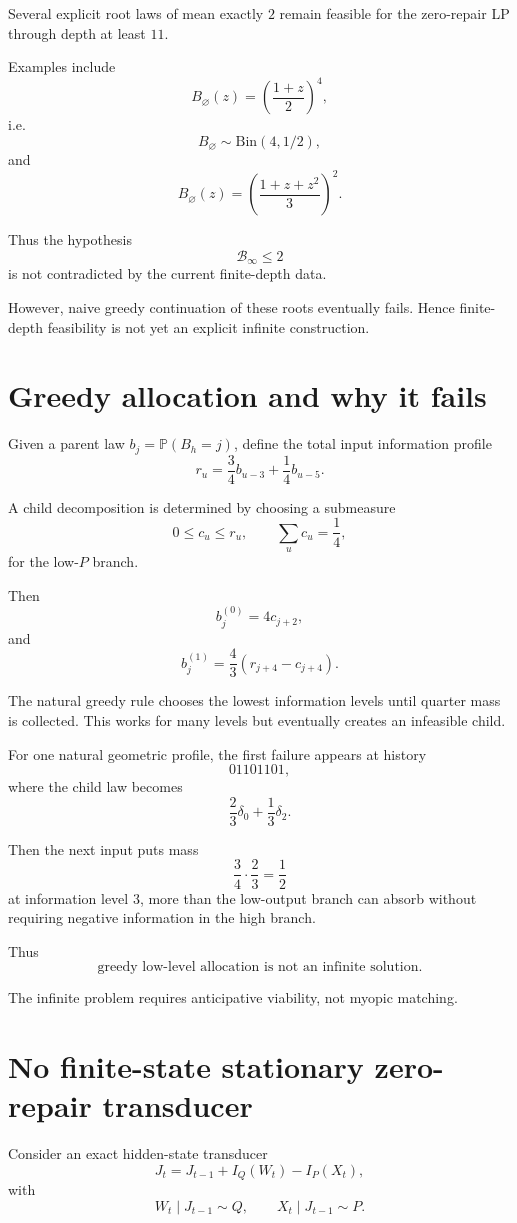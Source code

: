 \documentclass[11pt,a4paper]{article}
\newcommand{\PP}{\mathbb P}
\newcommand{\cB}{\mathcal B}
\begin{document}
Several explicit root laws of mean exactly \(2\) remain feasible for the
zero-repair LP through depth at least \(11\).

Examples include
\[
B_\varnothing(z)
=
\left(\frac{1+z}{2}\right)^4,
\]
i.e.
\[
B_\varnothing\sim \mathrm{Bin}(4,1/2),
\]
and
\[
B_\varnothing(z)
=
\left(\frac{1+z+z^2}{3}\right)^2.
\]

Thus the hypothesis
\[
\cB_\infty\le2
\]
is not contradicted by the current finite-depth data.

However, naive greedy continuation of these roots eventually fails.
Hence finite-depth feasibility is not yet an explicit infinite construction.

\section{Greedy allocation and why it fails}

Given a parent law \(b_j=\PP(B_h=j)\), define the total input information
profile
\[
r_u
=
\frac34 b_{u-3}
+
\frac14 b_{u-5}.
\]

A child decomposition is determined by choosing a submeasure
\[
0\le c_u\le r_u,
\qquad
\sum_u c_u=\frac14,
\]
for the low-\(P\) branch.

Then
\[
b^{(0)}_j
=
4c_{j+2},
\]
and
\[
b^{(1)}_j
=
\frac43
\left(
r_{j+4}-c_{j+4}
\right).
\]

The natural greedy rule chooses the lowest information levels until
quarter mass is collected.  This works for many levels but eventually
creates an infeasible child.

For one natural geometric profile, the first failure appears at history
\[
01101101,
\]
where the child law becomes
\[
\frac23\delta_0+\frac13\delta_2.
\]

Then the next input puts mass
\[
\frac34\cdot\frac23
=
\frac12
\]
at information level \(3\), more than the low-output branch can absorb
without requiring negative information in the high branch.

Thus
\[
\boxed{
\text{greedy low-level allocation is not an infinite solution.}
}
\]

The infinite problem requires anticipative viability, not myopic matching.

\section{No finite-state stationary zero-repair transducer}

Consider an exact hidden-state transducer
\[
J_t
=
J_{t-1}+I_Q(W_t)-I_P(X_t),
\]
with
\[
W_t\mid J_{t-1}\sim Q,
\qquad
X_t\mid J_{t-1}\sim P.
\]
\end{document}
